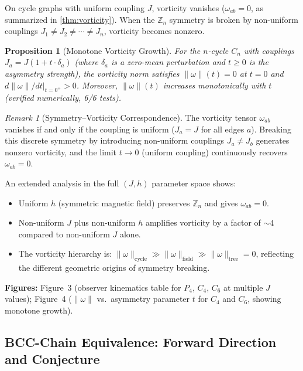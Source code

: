 \documentclass[11pt]{article}
\newtheorem{proposition}[theorem]{Proposition}
\theoremstyle{definition}
\theoremstyle{remark}
\newtheorem{remark}[theorem]{Remark}
\newcommand{\vort}{\omega}
\begin{document}
On cycle graphs with uniform coupling $J$, vorticity vanishes
($\vort_{ab} = 0$, as summarized in \cref{thm:vorticity}).
When the $\mathbb{Z}_n$ symmetry is broken by non-uniform couplings
$J_1 \neq J_2 \neq \cdots \neq J_n$, vorticity becomes nonzero.

\begin{proposition}[Monotone Vorticity Growth]
\label{prop:vorticity-growth}
For the $n$-cycle $C_n$ with couplings $J_a = J(1 + t \cdot \delta_a)$
(where $\delta_a$ is a zero-mean perturbation and $t \geq 0$ is the
asymmetry strength), the vorticity norm satisfies
$\|\vort\|(t) = 0$ at $t = 0$ and
$d\|\vort\|/dt \big|_{t=0^+} > 0$.
Moreover, $\|\vort\|(t)$ increases monotonically with $t$
(verified numerically, 6/6 tests).
\end{proposition}

\begin{remark}[Symmetry--Vorticity Correspondence]
The vorticity tensor $\vort_{ab}$ vanishes if and only if the coupling
is uniform ($J_a = J$ for all edges $a$). Breaking this discrete symmetry
by introducing non-uniform couplings $J_a \neq J_b$ generates nonzero
vorticity, and the limit $t \to 0$ (uniform coupling) continuously
recovers $\vort_{ab} = 0$.
\end{remark}

An extended analysis in the full $(J, h)$ parameter space shows:
\begin{itemize}
\item Uniform $h$ (symmetric magnetic field) preserves $\mathbb{Z}_n$
  and gives $\vort_{ab} = 0$.
\item Non-uniform $J$ plus non-uniform $h$ amplifies vorticity by
  a factor of $\sim 4$ compared to non-uniform $J$ alone.
\item The vorticity hierarchy is:
  $\|\vort\|_{\text{cycle}} \gg \|\vort\|_{\text{field}} \gg
  \|\vort\|_{\text{tree}} = 0$,
  reflecting the different geometric origins of symmetry breaking.
\end{itemize}

\textbf{Figures:} Figure~3 (observer kinematics table for $P_4$, $C_4$,
$C_6$ at multiple $J$ values); Figure~4 ($\|\vort\|$ vs.\ asymmetry
parameter $t$ for $C_4$ and $C_6$, showing monotone growth).

\subsection{BCC-Chain Equivalence: Forward Direction and Conjecture}
\label{subsec:bcc-chain-complete}
\end{document}
